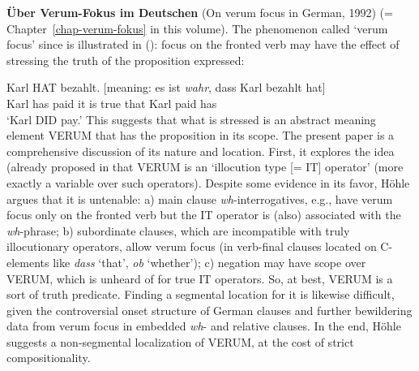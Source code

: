 \begin{refsection}
\textbf{Über Verum-Fokus im Deutschen} (On verum focus in German, 1992) (= Chapter~\ref{chap-verum-fokus} in this volume). The
phenomenon called `verum focus' since \citet{Hoehle1988} is illustrated in (): focus on the
fronted verb may have the effect of stressing the truth of the proposition expressed:   

\ea
\gll	 	Karl HAT bezahlt.   [meaning: es ist \emph{wahr}, dass Karl  bezahlt hat]\\
	       Karl has    paid      {}          it  is  true    that  Karl paid      has\\
\glt           `Karl DID pay.'
\z
%
This suggests that what is stressed is an abstract meaning element VERUM that has the proposition in
its scope. The present paper is a comprehensive discussion of its nature and location. First, it
explores the idea (already proposed in  that VERUM is an
`illocution type [= IT] operator' (more exactly a variable over such operators). Despite some
evidence in its favor, Höhle argues that it is untenable: a) main clause \emph{wh}-interrogatives, e.g., have
verum focus only on the fronted verb but the IT operator is (also) associated with the \emph{wh}-phrase; b)
subordinate clauses, which are incompatible with truly illocutionary operators, allow verum focus
(in verb-final clauses located on C-elements like \emph{dass} `that', \emph{ob} `whether'); c) negation may have scope over VERUM, which is unheard of
for true IT operators. So, at best, VERUM is a sort of truth predicate. Finding a segmental
location for it is likewise difficult, given the controversial onset structure of German clauses
and further bewildering data from verum focus in embedded \emph{wh}- and relative clauses. In the end,
Höhle suggests a non-segmental localization of VERUM, at the cost of strict compositionality. 
	

\end{refsection}
